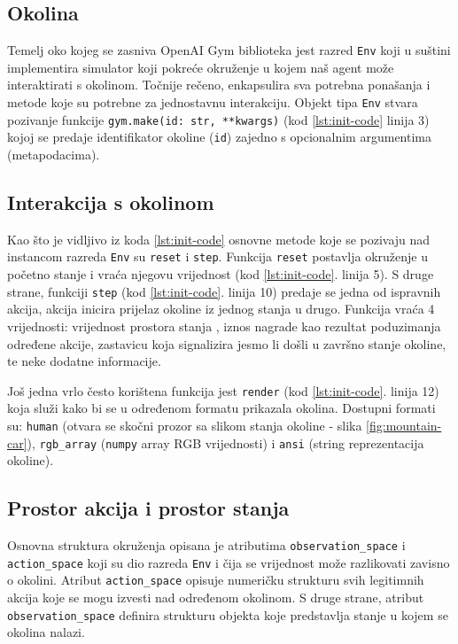 \subsection{Okolina}

Temelj oko kojeg se zasniva OpenAI Gym biblioteka jest razred  \texttt{Env} koji u suštini implementira simulator koji pokreće okruženje u kojem naš agent može interaktirati s okolinom. Točnije rečeno, enkapsulira sva potrebna ponašanja i metode koje su potrebne za jednostavnu interakciju. Objekt tipa \texttt{Env} stvara pozivanje funkcije \texttt{gym.make(id: str, **kwargs)} (kod \ref{lst:init-code} linija 3) kojoj se predaje identifikator okoline (\texttt{id}) zajedno s opcionalnim argumentima (metapodacima). 

\subsection{Interakcija s okolinom}

Kao što je vidljivo iz koda \ref{lst:init-code} osnovne metode koje se pozivaju nad instancom razreda \texttt{Env} su \texttt{reset} i \texttt{step}. Funkcija \texttt{reset} postavlja okruženje u početno stanje i vraća njegovu vrijednost (kod \ref{lst:init-code}. linija 5). S druge strane, funkciji \texttt{step} (kod \ref{lst:init-code}. linija 10) predaje se jedna od ispravnih akcija, akcija inicira prijelaz okoline iz jednog stanja u drugo. Funkcija vraća 4 vrijednosti: vrijednost prostora stanja , iznos nagrade  kao rezultat poduzimanja određene akcije, zastavicu koja signalizira jesmo li došli u završno stanje okoline, te neke dodatne informacije.

Još jedna vrlo često korištena funkcija jest \texttt{render} (kod \ref{lst:init-code}. linija 12) koja služi kako bi se u određenom formatu prikazala okolina. Dostupni formati su: \texttt{human} (otvara se skočni prozor sa slikom stanja okoline - slika \ref{fig:mountain-car}), \texttt{rgb_array} (\texttt{numpy} array RGB vrijednosti) i \texttt{ansi} (string reprezentacija okoline).

\subsection{Prostor akcija i prostor stanja}

Osnovna struktura okruženja opisana je atributima \texttt{observation_space} i \texttt{action_space} koji su dio razreda \texttt{Env} i čija se vrijednost može razlikovati zavisno o okolini. Atribut \texttt{action_space} opisuje numeričku strukturu svih legitimnih akcija koje se mogu izvesti nad određenom okolinom. S druge strane, atribut \texttt{observation_space} definira strukturu objekta koje predstavlja stanje u kojem se okolina nalazi.

